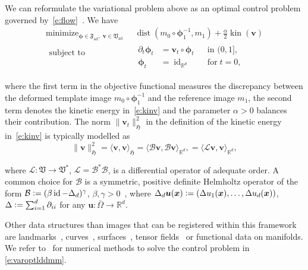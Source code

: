 \documentclass[11pt]{amsart}
\newcommand\fs[1]{\ensuremath{\mathfrak{#1}}}
\newcommand\op[1]{\ensuremath{\mathcal{#1}}}
\newcommand{\ilap}{\rotatebox[origin=c]{180}{$\nabla$}}
\newcommand{\defeq}{\ensuremath{\mathrel{\mathop:}=}}
\DeclareMathOperator*\minopt{\ensuremath{minimize}}
\renewcommand{\vec}[1]{\ensuremath{\boldsymbol{#1}}}
\newcommand\dual{\ensuremath{\ast}}
\begin{document}
\noindent We can reformulate the variational problem above as an optimal control problem governed by~\eqref{e:flow}~\cite{Beg:2005a,Dupuis:1998a}. We have
\begin{subequations}\label{e:varoptlddmm}
\begin{align}
\minopt_{\vec{\phi} \in \fs{F}_{\text{ad}},\;\vec{v}\in\fs{V}_{\text{ad}}} \;\;
& \operatorname{dist}( m_0 \circ \vec{\phi}_1^{-1},m_1)
+ \frac{\alpha}{2}\operatorname{kin}(\vec{v})\\
\begin{aligned}
\text{subject to} \;\;\\{}\\
\end{aligned}
&
\begin{aligned}
\partial_t \vec{\phi}_t & = \vec{v}_t \circ \vec{\phi}_t && \text{in } (0,1],\\
\vec{\phi}_t & = \operatorname{id}_{\mathbb{R}^d} && \text{for}\; t = 0,
\end{aligned}
\end{align}
\end{subequations}

\noindent where the first term in the objective functional measures the discrepancy between the deformed template image $m_0 \circ \vec{\phi}_1^{-1}$ and the reference image $m_1$, the second term denotes the kinetic energy in~\eqref{e:kinv} and the parameter $\alpha > 0$ balances their contribution. The norm $\|\vec{v}_t \|^2_{\fs{H}}$ in the definition of the kinetic energy in~\eqref{e:kinv} is typically modelled as
\[
\|\vec{v}\|_{\fs{H}}^2
= \langle\vec{v},\vec{v}\rangle_{\fs{H}}
= \langle\op{B}\vec{v},\op{B}\vec{v}\rangle_{\mathbb{R}^d},
= \langle\op{L}\vec{v},\vec{v}\rangle_{\mathbb{R}^d},
\]

\noindent where $\op{L} : \fs{V} \to \fs{V}^\dual$, $\op{L} = \op{B}^\ast\op{B}$, is a differential operator of adequate order. A common choice for $\op{B}$ is a symmetric, positive definite Helmholtz operator of the form $\op{B} \defeq (\beta \operatorname{id} - \ilap_d)^\gamma$, $\beta, \gamma > 0$~\cite{Beg:2005a}, where $\ilap_d \vec{u}(\vec{x}) \defeq ( \ilap u_1(\vec{x}), \ldots, \ilap u_d(\vec{x}))$, $\ilap \defeq \sum_{i=1}^d \partial_{ii}$ for any $\vec{u} : \bar{\Omega} \to \mathbb{R}^d$.

Other data structures than images that can be registered within this framework are landmarks~\cite{Glaunes:2004b,Joshi:2000a}, curves~\cite{Durrleman:2010a,Durrleman:2008a}, surfaces~\cite{Zhang:2021a,Azencott:2010a,Hartman:2023a,Mang:2023a,Durrleman:2010a,Glaunes:2006a,Kurtek:2012a,Arguillere:2016a}, tensor fields~\cite{Cao:2006a} or functional data on manifolds. We refer to~\cite{Beg:2005a,Azencott:2010a,Zhang:2021a,Mang:2023a,Polzin:2020a} for numerical methods to solve the control problem in \eqref{e:varoptlddmm}.
\end{document}
